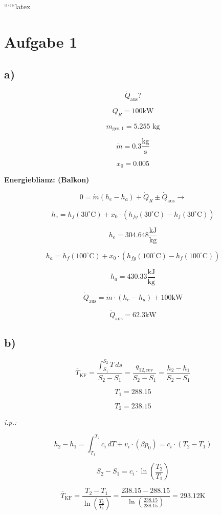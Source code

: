 
``````latex

\section*{Aufgabe 1}

\subsection*{a)}

\[
\dot{Q}_{\text{aus}}?
\]

\[
Q_R = 100 \text{kW}
\]

\[
m_{\text{ges},1} = 5.255 \text{ kg}
\]

\[
\dot{m} = 0.3 \frac{\text{kg}}{\text{s}}
\]

\[
x_0 = 0.005
\]

\textbf{Energieblianz: (Balkon)}

\[
0 = \dot{m}(h_e - h_a) + \dot{Q}_R \pm \dot{Q}_{\text{aus}} \rightarrow
\]

\[
h_e = h_f(30^\circ \text{C}) + x_0 \cdot (h_{fg}(30^\circ \text{C}) - h_f(30^\circ \text{C}))
\]

\[
h_e = 304.648 \frac{\text{kJ}}{\text{kg}}
\]

\[
h_a = h_f(100^\circ \text{C}) + x_0 \cdot (h_{fg}(100^\circ \text{C}) - h_f(100^\circ \text{C}))
\]

\[
h_a = 430.33 \frac{\text{kJ}}{\text{kg}}
\]

\[
\dot{Q}_{\text{aus}} = \dot{m} \cdot (h_e - h_a) + 100 \text{kW}
\]

\[
\dot{Q}_{\text{aus}} = 62.3 \text{kW}
\]

\subsection*{b)}

\[
\overline{T}_{\text{KF}} = \frac{\int_{S_1}^{S_2} T \, ds}{S_2 - S_1} = \frac{q_{12, \text{rev}}}{S_2 - S_1} = \frac{h_2 - h_1}{S_2 - S_1}
\]

\[
T_1 = 288.15
\]

\[
T_2 = 238.15
\]

\textit{i.p.:} 

\[
h_2 - h_1 = \int_{T_1}^{T_2} c_i \, dT + v_i \cdot (\beta p_0) = c_i \cdot (T_2 - T_1)
\]

\[
S_2 - S_1 = c_i \cdot \ln \left( \frac{T_2}{T_1} \right)
\]

\[
\overline{T}_{\text{KF}} = \frac{T_2 - T_1}{\ln \left( \frac{T_2}{T_1} \right)} = \frac{238.15 - 288.15}{\ln \left( \frac{238.15}{288.15} \right)} = 293.12 \text{K}
\]

